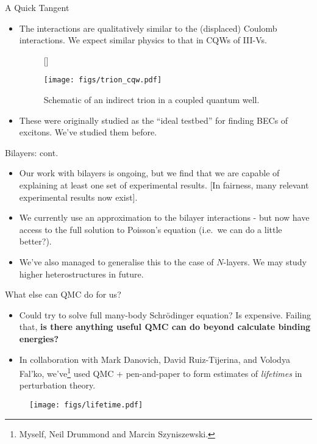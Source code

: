 \documentclass[12pt, pdf, hyperref={draft}, usenames, dvipsnames]{beamer}
\begin{document}
\begin{frame}{A Quick Tangent}

\begin{itemize}
  \item The interactions are qualitatively similar to the (displaced) Coulomb
  interactions. We expect similar physics to that in CQWs of III-Vs.


\begin{figure}[H]
  [\FBwidth]
  {\caption{Schematic of an indirect trion in a coupled quantum well.}\label{fig:trion_cqw}}
  {\texttt{[image: figs/trion\_cqw.pdf]}}
\end{figure}

  \item These were originally studied as the ``ideal testbed'' for finding BECs
  of excitons. We've studied them before.~

\end{itemize}

\end{frame}

\begin{frame}{Bilayers: cont.}

\begin{itemize}
  \item Our work with bilayers is ongoing, but we find that we are capable of
  explaining at least one set of experimental results. [In fairness, many
  relevant experimental results now exist].
  \item We currently use an approximation to the bilayer interactions - but now
  have access to the full solution to Poisson's equation (i.e.\ we can do a
  little better?).
  \item We've also managed to generalise this to the case of $N$-layers. We may
  study higher heterostructures in future.
\end{itemize}
\end{frame}

\begin{frame}{What else can QMC do for us?}

\begin{itemize} \item Could try to solve full many-body Schr\"{o}dinger
equation? Is expensive. Failing that, {\bf is there anything useful QMC can do
beyond calculate binding energies?}

  \item In collaboration with Mark Danovich, David Ruiz-Tijerina, and Volodya
  Fal'ko, we've\footnote{Myself, Neil Drummond and Marcin Szyniszewski.} used
  QMC + pen-and-paper to form estimates of {\it lifetimes\/} in perturbation
  theory.
  \end{itemize}

  \begin{figure}[H]
    \centering
    \texttt{[image: figs/lifetime.pdf]}
\label{fig:lifetime}
  \end{figure}

\end{frame}
\end{document}
